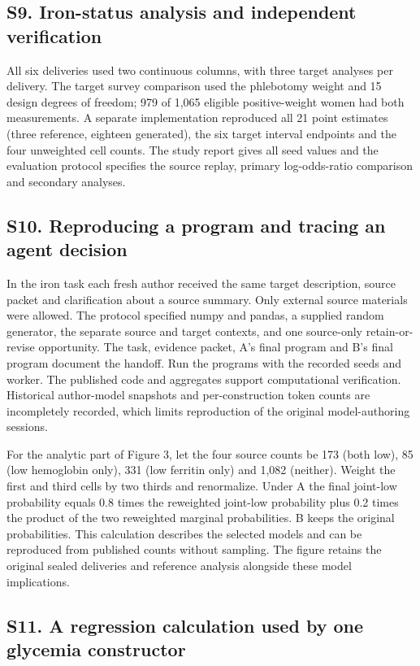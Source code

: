 \documentclass[11pt,letterpaper]{article}
\begin{document}
\subsection*{S9. Iron-status analysis and independent verification}

All six deliveries used two continuous columns, with three target analyses per delivery. The target survey comparison used the phlebotomy weight and 15 design degrees of freedom; 979 of 1,065 eligible positive-weight women had both measurements. A separate implementation reproduced all 21 point estimates (three reference, eighteen generated), the six target interval endpoints and the four unweighted cell counts. The study report gives all seed values and the evaluation protocol specifies the source replay, primary log-odds-ratio comparison and secondary analyses.


\subsection*{S10. Reproducing a program and tracing an agent decision}

In the iron task each fresh author received the same target description, source packet and clarification about a source summary. Only external source materials were allowed. The protocol specified numpy and pandas, a supplied random generator, the separate source and target contexts, and one source-only retain-or-revise opportunity. The task, evidence packet, A's final program and B's final program document the handoff. Run the programs with the recorded seeds and worker. The published code and aggregates support computational verification. Historical author-model snapshots and per-construction token counts are incompletely recorded, which limits reproduction of the original model-authoring sessions.


For the analytic part of Figure 3, let the four source counts be 173 (both low), 85 (low hemoglobin only), 331 (low ferritin only) and 1,082 (neither). Weight the first and third cells by two thirds and renormalize. Under A the final joint-low probability equals 0.8 times the reweighted joint-low probability plus 0.2 times the product of the two reweighted marginal probabilities. B keeps the original probabilities. This calculation describes the selected models and can be reproduced from published counts without sampling. The figure retains the original sealed deliveries and reference analysis alongside these model implications.


\subsection*{S11. A regression calculation used by one glycemia constructor}
\end{document}

